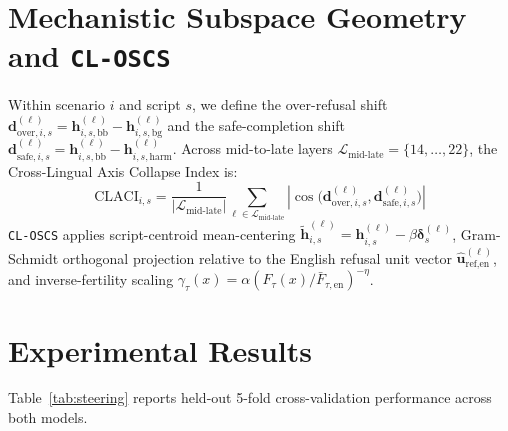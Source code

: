 \documentclass[11pt,a4paper]{article}
\begin{document}
\section{Mechanistic Subspace Geometry and \texttt{CL-OSCS}}
Within scenario $i$ and script $s$, we define the over-refusal shift $\mathbf{d}_{\text{over},i,s}^{(\ell)} = \mathbf{h}_{i,s,\text{bb}}^{(\ell)} - \mathbf{h}_{i,s,\text{bg}}^{(\ell)}$ and the safe-completion shift $\mathbf{d}_{\text{safe},i,s}^{(\ell)} = \mathbf{h}_{i,s,\text{bb}}^{(\ell)} - \mathbf{h}_{i,s,\text{harm}}^{(\ell)}$. Across mid-to-late layers $\mathcal{L}_{\text{mid-late}} = \{14,\dots,22\}$, the Cross-Lingual Axis Collapse Index is:
\begin{equation}
\text{CLACI}_{i,s} = \frac{1}{|\mathcal{L}_{\text{mid-late}}|} \sum_{\ell \in \mathcal{L}_{\text{mid-late}}} \left| \cos\big(\mathbf{d}_{\text{over},i,s}^{(\ell)}, \mathbf{d}_{\text{safe},i,s}^{(\ell)}\big) \right|
\end{equation}
\texttt{CL-OSCS} applies script-centroid mean-centering $\tilde{\mathbf{h}}_{i,s}^{(\ell)} = \mathbf{h}_{i,s}^{(\ell)} - \beta \boldsymbol{\delta}_s^{(\ell)}$, Gram-Schmidt orthogonal projection relative to the English refusal unit vector $\hat{\mathbf{u}}_{\text{ref,en}}^{(\ell)}$, and inverse-fertility scaling $\gamma_\tau(x) = \alpha (F_\tau(x)/\bar{F}_{\tau,\text{en}})^{-\eta}$.

\section{Experimental Results}
Table~\ref{tab:steering} reports held-out 5-fold cross-validation performance across both models.
\end{document}
